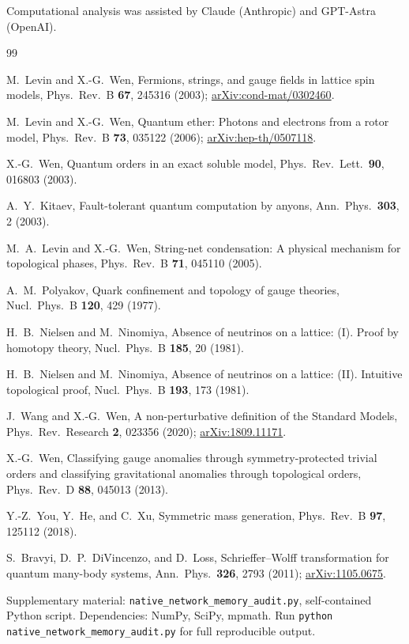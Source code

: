 \documentclass[aps,prb,twocolumn,superscriptaddress,showpacs]{revtex4-2}
\begin{document}
\begin{acknowledgments}
Computational analysis was assisted by Claude (Anthropic) and GPT-Astra (OpenAI).
\end{acknowledgments}

\begin{thebibliography}{99}

M.~Levin and X.-G.~Wen,
Fermions, strings, and gauge fields in lattice spin models,
Phys.\ Rev.\ B \textbf{67}, 245316 (2003);
\href{https://arxiv.org/abs/cond-mat/0302460}{arXiv:cond-mat/0302460}.

M.~Levin and X.-G.~Wen,
Quantum ether: Photons and electrons from a rotor model,
Phys.\ Rev.\ B \textbf{73}, 035122 (2006);
\href{https://arxiv.org/abs/hep-th/0507118}{arXiv:hep-th/0507118}.

X.-G.~Wen,
Quantum orders in an exact soluble model,
Phys.\ Rev.\ Lett.\ \textbf{90}, 016803 (2003).

A.~Y.~Kitaev,
Fault-tolerant quantum computation by anyons,
Ann.\ Phys.\ \textbf{303}, 2 (2003).

M.~A.~Levin and X.-G.~Wen,
String-net condensation: A physical mechanism for topological phases,
Phys.\ Rev.\ B \textbf{71}, 045110 (2005).

A.~M.~Polyakov,
Quark confinement and topology of gauge theories,
Nucl.\ Phys.\ B \textbf{120}, 429 (1977).

H.~B.~Nielsen and M.~Ninomiya,
Absence of neutrinos on a lattice: (I). Proof by homotopy theory,
Nucl.\ Phys.\ B \textbf{185}, 20 (1981).

H.~B.~Nielsen and M.~Ninomiya,
Absence of neutrinos on a lattice: (II). Intuitive topological proof,
Nucl.\ Phys.\ B \textbf{193}, 173 (1981).

J.~Wang and X.-G.~Wen,
A non-perturbative definition of the Standard Models,
Phys.\ Rev.\ Research \textbf{2}, 023356 (2020);
\href{https://arxiv.org/abs/1809.11171}{arXiv:1809.11171}.

X.-G.~Wen,
Classifying gauge anomalies through symmetry-protected trivial orders
and classifying gravitational anomalies through topological orders,
Phys.\ Rev.\ D \textbf{88}, 045013 (2013).

Y.-Z.~You, Y.~He, and C.~Xu,
Symmetric mass generation,
Phys.\ Rev.\ B \textbf{97}, 125112 (2018).

S.~Bravyi, D.~P.~DiVincenzo, and D.~Loss,
Schrieffer--Wolff transformation for quantum many-body systems,
Ann.\ Phys.\ \textbf{326}, 2793 (2011);
\href{https://arxiv.org/abs/1105.0675}{arXiv:1105.0675}.

Supplementary material: \texttt{native\_network\_memory\_audit.py},
self-contained Python script. Dependencies: NumPy, SciPy, mpmath.
Run \texttt{python native\_network\_memory\_audit.py} for full
reproducible output.

\end{thebibliography}
\end{document}
